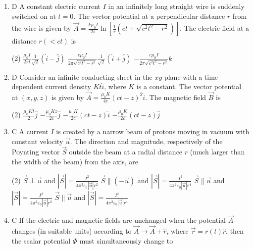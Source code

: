 \begin{enumerate}
	\item	D A constant electric current $I$ in an infinitely long straight wire is suddenly switched on at $t=0$. The vector potential at a perpendicular distance $r$ from the wire is given by $\vec{A}=\frac{\hat{k} \mu_{0} I}{2 \pi} \ln \left[\frac{1}{r}\left(c t+\sqrt{c^{2} t^{2}-r^{2}}\right)\right]$. The electric field at a distance $r(<c t)$ is
	{}
	\begin{tasks}(2)
		\task[\textbf{B.}] $\frac{\mu_{0} I}{2 \pi t} \frac{1}{\sqrt{2}}(\hat{i}-\hat{j})$
		\task[\textbf{C.}] $\frac{c \mu_{0} I}{2 \pi \sqrt{c^{2} t^{2}-r^{2}}} \frac{1}{\sqrt{2}}(\hat{i}+\hat{j})$
		\task[\textbf{D.}] $-\frac{c \mu_{0} I}{2 \pi \sqrt{c^{2} t^{2}-r^{2}}} \hat{k}$
	\end{tasks}
	\item D Consider an infinite conducting sheet in the $x y$-plane with a time dependent current density $K t \hat{i}$, where $K$ is a constant. The vector potential at $(x, y, z)$ is given by $\vec{A}=\frac{\mu_{0} K}{4 c}(c t-z)^{2} \hat{i}$. The magnetic field $\vec{B}$ is
	{	}
	\begin{tasks}(2)
		\task[\textbf{A.}] $\frac{\mu_{0} K t}{2} \hat{j}$
		\task[\textbf{B.}] $-\frac{\mu_{0} K z}{2 c} \hat{j}$
		\task[\textbf{C.}] $-\frac{\mu_{0} K}{2 c}(c t-z) \hat{i}$
		\task[\textbf{D.}] $-\frac{\mu_{0} K}{2 c}(c t-z) \hat{j}$
	\end{tasks}
	\item C A current $I$ is created by a narrow beam of protons moving in vacuum with constant velocity $\vec{u}$. The direction and magnitude, respectively of the Poynting vector $\vec{S}$ outside the beam at a radial distance $r$ (much larger than the width of the beam) from the axis, are
	{	}
	\begin{tasks}(2)
		\task[\textbf{A.}] $\vec{S} \perp \vec{u}$ and $|\vec{S}|=\frac{I^{2}}{4 \pi^{2} \varepsilon_{0}|\vec{u}| r^{2}}$
		\task[\textbf{B.}] $\vec{S} \|(-\vec{u})$ and $|\vec{S}|=\frac{I^{2}}{4 \pi^{2} \varepsilon_{0}|\vec{u}| r^{4}}$
		\task[\textbf{C.}] $\vec{S} \| \vec{u}$ and $|\vec{S}|=\frac{I^{2}}{4 \pi^{2} \varepsilon_{0}|\vec{u}| r^{2}}$
		\task[\textbf{D.}] $\vec{S} \| \vec{u}$ and $|\vec{S}|=\frac{I^{2}}{4 \pi^{2} \varepsilon_{0}|\vec{u}| r^{4}}$
	\end{tasks}
	\item
	C If the electric and magnetic fields are unchanged when the potential $\vec{A}$ changes (in suitable units) according to $\vec{A} \rightarrow \vec{A}+\hat{r}$, where $\vec{r}=r(t) \hat{r}$, then the scalar potential $\Phi$ must simultaneously change to

\end{enumerate}
